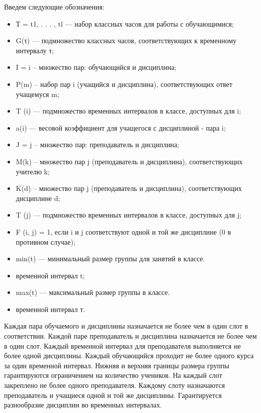 Введем следующие обозначения:
\begin{itemize}
    \item Т = {t1, . . . , tl} — набор классных часов для работы с обучающимися;
    \item G(τ) — подмножество классных часов, соответствующих к временному интервалу τ;
    \item I = {i} – множество пар: обучающийся и дисциплина;
    \item P(m) – набор пар i (учащийся и дисциплина), соответствующих ответ учащемуся m;
    \item T (i) — подмножество временных интервалов в классе, доступных для i;
    \item a(i) — весовой коэффициент для учащегося с дисциплиной - пара i;
    \item J = {j} – множество пар: преподаватель и дисциплина;
    \item M(k) – множество пар j (преподаватель и дисциплина), соответствующих учителю k;
    \item K(d) – множество пар j (преподаватель и дисциплина), соответствующих дисциплине d;
    \item T (j) — подмножество временных интервалов в классе, доступных для j;
    \item F (i, j) = 1, если i и j соответствуют одной и той же дисциплине (0 в противном случае);
    \item min(t) — минимальный размер группы для занятий в классе.
    \item временной интервал t;
    \item max(t) — максимальный размер группы в классе.
    \item временной интервал т.
\end{itemize}

Каждая пара обучаемого и дисциплины назначается не более чем в один слот в соответствии. Каждой паре преподаватель и дисциплина назначается не более чем в один слот. Каждый временной интервал для преподавателя выполняется не более одной дисциплины. Каждый обучающийся проходит не более одного курса за один временной интервал. Нижняя и верхняя границы размера группы гарантируются ограничением на количество учеников. На каждый слот закреплено не более одного преподавателя. Каждому слоту назначаются преподаватель и учащиеся одной и той же дисциплины. Гарантируется разнообразие дисциплин во временных интервалах.

